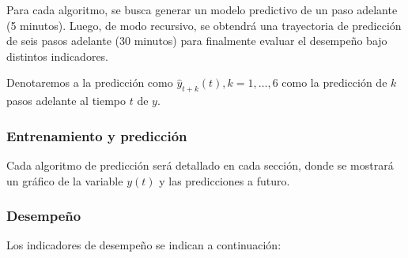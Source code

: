 Para cada algoritmo, se busca generar un modelo predictivo de un paso adelante (5 minutos). Luego, de modo recursivo, se obtendrá una trayectoria de predicción de seis pasos adelante (30 minutos) para finalmente evaluar el desempeño bajo distintos indicadores. 

Denotaremos a la predicción como $\hat{y}_{t+k}(t), k= 1, \dots, 6$ como la predicción de $k$ pasos adelante al tiempo $t$ de $y$. 

\subsubsection*{Entrenamiento y predicción}

Cada algoritmo de predicción será detallado en cada sección, donde se mostrará un gráfico de la variable $y(t)$ y las predicciones a futuro.

\subsubsection*{Desempeño}

Los indicadores de desempeño se indican a continuación:

